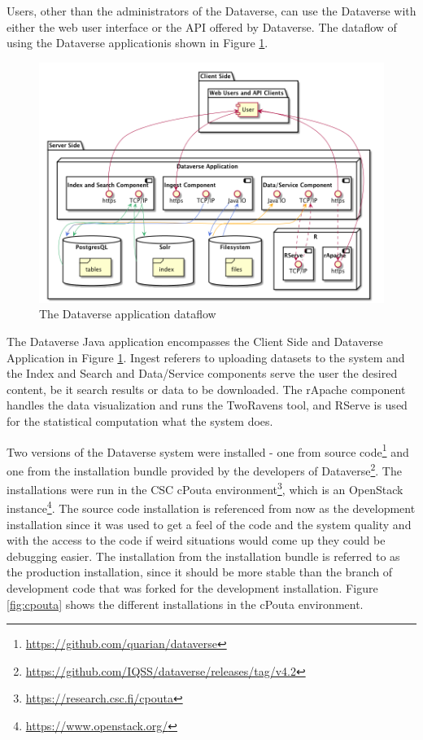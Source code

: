 Users, other than the administrators of the Dataverse, can use the Dataverse
with either the web user interface or the API offered by Dataverse. The
dataflow of using the Dataverse application is shown in Figure
\ref{fig:dataflow}.

\begin{figure}
    \begin{centering}
        \includegraphics[width=\textwidth]{images/dataflow}
    \end{centering}
    \caption[The Dataverse application dataflow]{The Dataverse application dataflow}
    \label{fig:dataflow}
\end{figure}

The Dataverse Java application encompasses the Client Side and Dataverse
Application in Figure \ref{fig:dataflow}. Ingest referers to uploading datasets
to the system and the Index and Search and Data/Service components serve the
user the desired content, be it search results or data to be downloaded. The
rApache component handles the data visualization and runs the TwoRavens tool,
and RServe is used for the statistical computation what the system does.

Two versions of the Dataverse system were installed - one from source
code\footnote{\url{https://github.com/quarian/dataverse}} and one from the
installation bundle provided by the developers of
Dataverse\footnote{\url{https://github.com/IQSS/dataverse/releases/tag/v4.2}}.
The installations were run in the CSC cPouta
environment\footnote{\url{https://research.csc.fi/cpouta}}, which is an
OpenStack instance\footnote{\url{https://www.openstack.org/}}. The source code
installation is referenced from now as the development installation since it
was used to get a feel of the code and the system quality and with the access
to the code if weird situations would come up they could be debugging easier.
The installation from the installation bundle is referred to as the production
installation, since it should be more stable than the branch of development
code that was forked for the development installation. Figure
\ref{fig:cpouta} shows the different installations in the cPouta environment.

